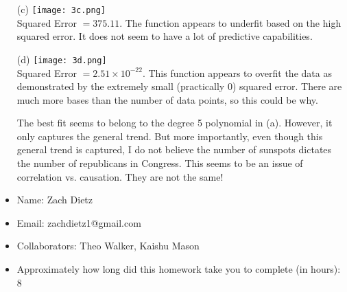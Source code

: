 \documentclass[submit]{harvardml}
\begin{document}
\begin{enumerate}
\begin{enumerate}
        \item[(c)] \hspace\break\texttt{[image: 3c.png]} 
        \\Squared Error $= 375.11$. The function appears to underfit based on the high squared error. It does not seem to have a lot of predictive capabilities.
        \item[(d)] \hspace\break\texttt{[image: 3d.png]}
        \\Squared Error $= 2.51\times10^{-22}$. This function appears to overfit the data as demonstrated by the extremely small (practically 0) squared error. There are much more bases than the number of data points, so this could be why.
        
        The best fit seems to belong to the degree 5 polynomial in (a). However, it only captures the general trend. But more importantly, even though this general trend is captured, I do not believe the number of sunspots dictates the number of republicans in Congress. This seems to be an issue of correlation vs. causation. They are not the same!
    \end{enumerate}
\end{enumerate}

\newpage
\begin{problem}[Administrative]
\leavevmode
\begin{itemize}
    \item Name: Zach Dietz
    \item Email: zachdietz1@gmail.com
    \item Collaborators: Theo Walker, Kaishu Mason
    \item Approximately how long did this homework take you to complete (in hours):   8
\end{itemize}
\end{problem}
\end{document}
